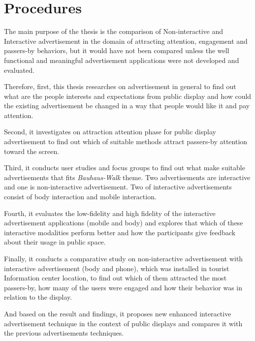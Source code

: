 \section{Procedures}

The main purpose of the thesis is the comparison of Non-interactive and Interactive advertisement in the domain of attracting attention, engagement and passers-by behaviors, but it would have not been compared unless the well functional and meaningful advertisement applications were not developed and evaluated. 

Therefore, first, this thesis researches on advertisement in general to find out what are the people interests and expectations from public display and how could the existing advertisement be changed in a way that people would like it and pay attention.

Second, it investigates on attraction attention phase for public display advertisement to find out which of suitable methods attract passers-by attention toward the screen.

Third, it conducts user studies and focus groups to find out what make suitable advertisements that fits \emph{Bauhaus-Walk} theme. Two advertisements are interactive and one is non-interactive advertisement. Two of interactive advertisements consist of body interaction and mobile interaction.

Fourth, it evaluates the low-fidelity and high fidelity of the interactive advertisement applications (mobile and body) and explores that which of these interactive modalities perform better and how the participants give feedback about their usage in public space.

Finally, it conducts a comparative study on non-interactive advertisement with interactive advertisement (body and phone), which was installed in tourist Information center location, to find out which of them attracted the most passers-by, how many of the users were engaged and how their behavior was in relation to the display.

And based on the result and findings, it proposes new enhanced interactive advertisement technique in the context of public displays and compares it with the previous advertisements techniques.



